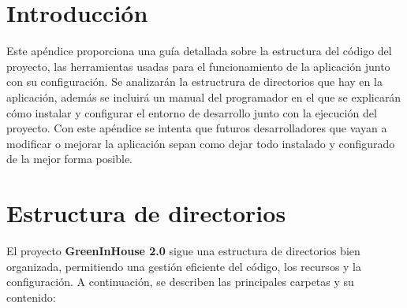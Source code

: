 
\section{Introducción}
Este apéndice proporciona una guía detallada sobre la estructura del código del proyecto, las herramientas usadas para el funcionamiento de la aplicación junto con su configuración.
Se analizarán la estructrura de directorios que hay en la aplicación, además se incluirá un manual del programador en el que se explicarán cómo instalar y configurar el entorno de desarrollo junto con la ejecución del proyecto.
Con este apéndice se intenta que futuros desarrolladores que vayan a modificar o mejorar la aplicación sepan como dejar todo instalado y configurado de la mejor forma posible.

\section{Estructura de directorios}

El proyecto \textbf{GreenInHouse 2.0} sigue una estructura de directorios bien organizada, permitiendo una gestión eficiente del código, los recursos y la configuración. A continuación, se describen las principales carpetas y su contenido:

